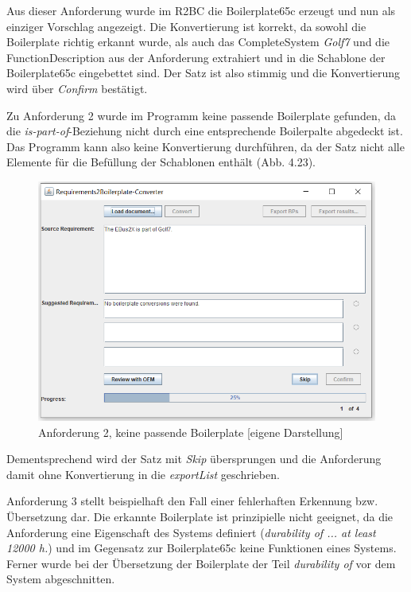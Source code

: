 \documentclass[12pt]{report}
\begin{document}
Aus dieser Anforderung wurde im R2BC die Boilerplate65c erzeugt und nun als einziger Vorschlag angezeigt. Die Konvertierung ist korrekt, da sowohl die Boilerplate richtig erkannt wurde, als auch das CompleteSystem \textit{Golf7} und die FunctionDescription aus der Anforderung extrahiert und in die Schablone der Boilerplate65c eingebettet sind. Der Satz ist also stimmig und die Konvertierung wird über \textit{Confirm} bestätigt. 

Zu Anforderung 2 wurde im Programm keine passende Boilerplate gefunden, da die \textit{is-part-of}-Beziehung nicht durch eine entsprechende Boilerpalte abgedeckt ist. Das Programm kann also keine Konvertierung durchführen, da der Satz nicht alle Elemente für die Befüllung der Schablonen enthält (Abb. 4.23).

\begin{figure}[h!]
\begin{center}
\includegraphics[scale=0.7]{Bilder/GUI-req2.png}
\caption{Anforderung 2, keine passende Boilerplate [eigene Darstellung]}
\end{center}
\end{figure}

Dementsprechend wird der Satz mit \textit{Skip} übersprungen und die Anforderung damit ohne Konvertierung in die \textit{exportList} geschrieben.

Anforderung 3 stellt beispielhaft den Fall einer fehlerhaften Erkennung bzw. Übersetzung dar. Die erkannte Boilerplate ist prinzipielle nicht geeignet, da die Anforderung eine Eigenschaft des Systems definiert (\textit{durability of ... at least 12000 h.}) und im Gegensatz zur Boilerplate65c keine Funktionen eines Systems. Ferner wurde bei der Übersetzung der Boilerplate der Teil \textit{durability of} vor dem System abgeschnitten.
\end{document}

